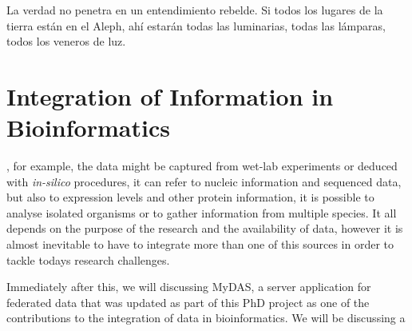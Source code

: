 \begin{savequote}[75mm] 
La verdad no penetra en un entendimiento rebelde. Si todos los lugares de la tierra est\'{a}n en el Aleph, ah\'{i} estar\'{a}n todas las luminarias, todas las l\'{a}mparas, todos los veneros de luz.
\end{savequote}

\chapter{Integration of Information in Bioinformatics}

, for example, the data might be captured from wet-lab experiments or deduced with \emph{in-silico} procedures, it can refer to nucleic information and sequenced data, but also to expression levels and other protein information, it is possible to analyse isolated organisms or to gather information from multiple species. It all depends on the purpose of the research and the availability of data, however it is almost inevitable to have to integrate more than one of this sources in order to tackle todays research challenges.

Immediately after this, we will discussing MyDAS, a server application for federated data that was updated as part of this PhD project as one of the contributions to the integration of data in bioinformatics. We will be discussing a 

